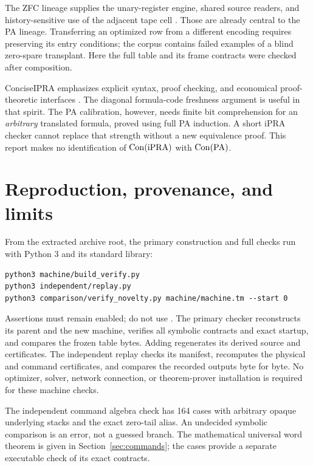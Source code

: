 The ZFC lineage supplies the unary-register engine, shared source readers,
and history-sensitive use of the adjacent tape cell \cite{zfc}. Those are
already central to the PA lineage. Transferring an optimized row from a
different encoding requires preserving its entry conditions; the corpus
contains failed examples of a blind zero-spare transplant. Here the full
table and its frame contracts were checked after composition.

ConciseIPRA emphasizes explicit syntax, proof checking, and economical
proof-theoretic interfaces \cite{ipra}. The diagonal formula-code freshness
argument is useful in that spirit. The PA calibration, however, needs
finite bit comprehension for an \emph{arbitrary} translated formula, proved
using full PA induction. A short iPRA checker cannot replace that strength
without a new equivalence proof. This report makes no identification of
$\operatorname{Con}(\mathrm{iPRA})$ with $\operatorname{Con}(\mathrm{PA})$.

\section{Reproduction, provenance, and limits}
\label{sec:reproduce}

From the extracted archive root, the primary construction and full checks
run with Python 3 and its standard library:
\begin{verbatim}
python3 machine/build_verify.py
python3 independent/replay.py
python3 comparison/verify_novelty.py machine/machine.tm --start 0
\end{verbatim}
Assertions must remain enabled; do not use . The primary
checker reconstructs its parent and the new machine, verifies all symbolic
contracts and exact startup, and compares the frozen table bytes. Adding
 regenerates its derived source and certificates.
The independent replay checks its manifest, recomputes the physical and
command certificates, and compares the recorded outputs byte for byte.
No optimizer, solver, network connection, or theorem-prover installation
is required for these machine checks.

The independent command algebra check has 164 cases with arbitrary opaque
underlying stacks and the exact zero-tail alias. An undecided symbolic
comparison is an error, not a guessed branch. The mathematical universal
word theorem is given in Section~\ref{sec:commands}; the cases provide a
separate executable check of its exact contracts.

